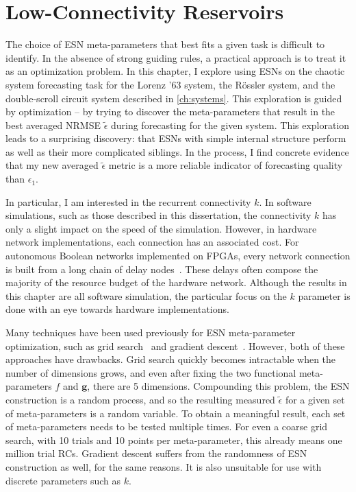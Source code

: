 \chapter{Low-Connectivity Reservoirs}\label{ch:low-connectivity}

The choice of ESN meta-parameters that best fits a given task is
difficult to identify. In the absence of strong guiding rules, a
practical approach is to treat it as an optimization problem. In this
chapter, I explore using ESNs on the chaotic system forecasting task
for the Lorenz '63 system, the R{\"{o}}ssler system, and the
double-scroll circuit system described in \cref{ch:systems}. This
exploration is guided by optimization -- by trying to discover the
meta-parameters that result in the best averaged NRMSE
$\tilde{\epsilon}$ during forecasting for the given system. This
exploration leads to a surprising discovery: that ESNs with simple
internal structure perform as well as their more complicated
siblings. In the process, I find concrete evidence that my new
averaged $\tilde{\epsilon}$ metric is a more reliable indicator of
forecasting quality than $\epsilon_1$.

In particular, I am interested in the recurrent connectivity $k$. In
software simulations, such as those described in this dissertation, the
connectivity $k$ has only a slight impact on the speed of the
simulation. However, in hardware network implementations, each
connection has an associated cost. For autonomous Boolean networks
implemented on FPGAs, every network connection is built from a long
chain of delay nodes~\cite{canaday2018}. These delays often compose the
majority of the resource budget of the hardware network. Although the
results in this chapter are all software simulation, the particular
focus on the $k$ parameter is done with an eye towards hardware
implementations.

Many techniques have been used previously for ESN meta-parameter
optimization, such as grid search~\cite{rodan2011} and gradient
descent~\cite{jaeger2007}. However, both of these approaches have
drawbacks. Grid search quickly becomes intractable when the number of
dimensions grows, and even after fixing the two functional
meta-parameters $f$ and $\bm{g}$, there are 5 dimensions.
Compounding this problem, the ESN construction is a random
process, and so the resulting measured $\tilde{\epsilon}$ for a given
set of meta-parameters is a random variable. To obtain a meaningful
result, each set of meta-parameters needs to be tested multiple
times. For even a coarse grid search, with 10 trials and 10 points per
meta-parameter, this already means one million trial RCs. Gradient
descent suffers from the randomness of ESN construction as well, for
the same reasons. It is also unsuitable for use with discrete
parameters such as $k$.

